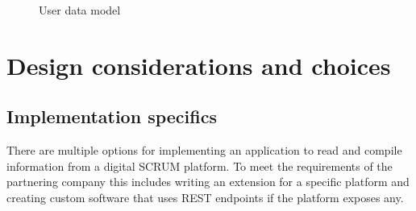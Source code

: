 \begin{figure}
    \centering
    
    \caption{User data model}
    \label{fig:user-model}
    
\end{figure}

\newpage

\section{Design considerations and choices}

\subsection{Implementation specifics}

There are multiple options for implementing an application to read and compile 
information from a digital SCRUM platform.
To meet the requirements of the partnering company this includes writing an extension for a 
specific platform and creating custom software that uses 
REST endpoints if the platform exposes any.

